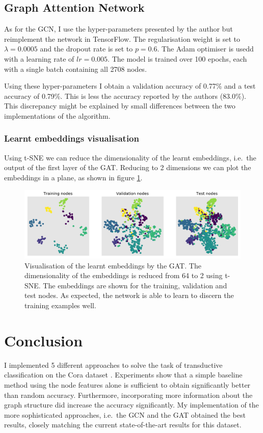 \documentclass[12pt]{article}
\theoremstyle{definition}
\begin{document}
\subsection{Graph Attention Network}
As for the GCN, I use the hyper-parameters presented by the author but reimplement the network in TensorFlow. The regularisation weight is set to $\lambda = 0.0005$ and the dropout rate is set to $p=0.6$. The Adam optimiser \cite{kingma2014adam} is usedd with a learning rate of $\textit{lr} = 0.005$. The model is trained over 100 epochs, each with a single batch containing all 2708 nodes.

Using these hyper-parameters I obtain a validation accuracy of 0.77\% and a test accuracy of 0.79\%. This is less the accuracy reported by the authors (83.0\%). This discrepancy might be explained by small differences between the two implementations of the algorithm. 

\subsubsection{Learnt embeddings visualisation}
Using t-SNE we can reduce the dimensionality of the learnt embeddings, i.e.\ the output of the first layer of the GAT. Reducing to 2 dimensions we can plot the embeddings in a plane, as shown in figure \ref{fig/gat_tsne}.
\begin{figure}[h]
	\includegraphics[width=1.0\textwidth]{gat/visualisation_tsne}
	\centering
	\caption{Visualisation of the learnt embeddings by the GAT. The dimensionality of the embeddings is reduced from 64 to 2 using t-SNE. The embeddings are shown for the training, validation and test nodes. As expected, the network is able to learn to discern the training examples well.}
	\label{fig/gat_tsne}
\end{figure}

\section{Conclusion}
	I implemented 5 different approaches to solve the task of transductive classification on the Cora dataset \cite{cora}. Experiments show that a simple baseline method using the node features alone is sufficient to obtain significantly better than random accuracy. Furthermore, incorporating more information about the graph structure did increase the accuracy significantly. My implementation of the more sophisticated approaches, i.e.\ the GCN and the GAT obtained the best results, closely matching the current state-of-the-art results for this dataset.	


\end{document}
